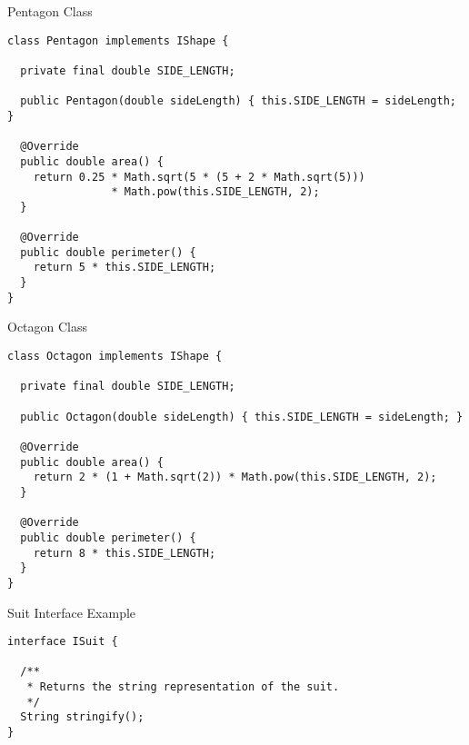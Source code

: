 \begin{cl}{Pentagon Class}
\begin{lstlisting}[language=MyJava]
class Pentagon implements IShape {
  
  private final double SIDE_LENGTH;

  public Pentagon(double sideLength) { this.SIDE_LENGTH = sideLength; }

  @Override
  public double area() {
    return 0.25 * Math.sqrt(5 * (5 + 2 * Math.sqrt(5))) 
                * Math.pow(this.SIDE_LENGTH, 2);
  }

  @Override
  public double perimeter() {
    return 5 * this.SIDE_LENGTH;
  }
}
\end{lstlisting}
\end{cl}

\begin{cl}{Octagon Class}
\begin{lstlisting}[language=MyJava]
class Octagon implements IShape {

  private final double SIDE_LENGTH;

  public Octagon(double sideLength) { this.SIDE_LENGTH = sideLength; }

  @Override
  public double area() {
    return 2 * (1 + Math.sqrt(2)) * Math.pow(this.SIDE_LENGTH, 2);
  }

  @Override
  public double perimeter() {
    return 8 * this.SIDE_LENGTH;
  }
}
\end{lstlisting}
\end{cl}


\begin{cl}{Suit Interface Example}
\begin{lstlisting}[language=MyJava]
interface ISuit {

  /**
   * Returns the string representation of the suit.
   */
  String stringify();
}
\end{lstlisting}
\end{cl}

